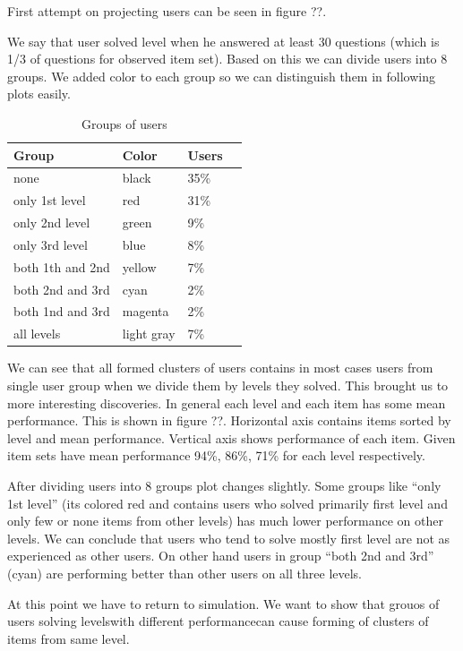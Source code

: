 \documentclass[
  digital, %
  table,   %
  nolof,     %
  nolot,     %
  nocover
]{fithesis3}
\begin{document}
First attempt on projecting users can be seen in figure ??.


We say that user solved level when he answered at least 30 questions
(which is 1/3 of questions for observed item set). Based on this we can
divide users into 8 groups. We added color to each group so we can
distinguish them in following plots easily.

\begin{table}
  \begin{tabular}{ | l | l | l | l | }
  \hline
  	Group & Color & Users \\ \hline
  	none & black & 35\% \\ \hline
  	only 1st level & red & 31\% \\ \hline
  	only 2nd level & green & 9\% \\ \hline
  	only 3rd level & blue  & 8\% \\ \hline
  	both 1th and 2nd & yellow & 7\% \\ \hline
  	both 2nd and 3rd & cyan & 2\% \\ \hline
  	both 1nd and 3rd & magenta & 2\% \\ \hline
  	all levels & light gray & 7\% \\ \hline
  \end{tabular}
  \caption{Groups of users}
  \label{tab:groups}
\end{table}


We can see that all formed clusters of users contains in most cases users
from single user group when we divide them by levels they solved. This
brought us to more interesting discoveries. In general each level and
each item has some mean performance. This is shown in figure ??.
Horizontal axis contains items sorted by level and mean performance.
Vertical axis shows performance of each item. Given item sets have mean
performance 94\%, 86\%, 71\% for each level respectively.

After dividing users into 8 groups plot changes slightly. Some groups
like ``only 1st level'' (its colored red and contains users who solved
primarily first level and only few or none items from other levels) has
much lower performance on other levels. We can conclude that users who
tend to solve mostly first level are not as experienced as other users. On
other hand users in group ``both 2nd and 3rd'' (cyan) are performing
better than other users on all three levels.

At this point we have to return to simulation. We want to show that
grouos of users solving levelswith different performancecan cause
forming of clusters of items from same level.
\end{document}
